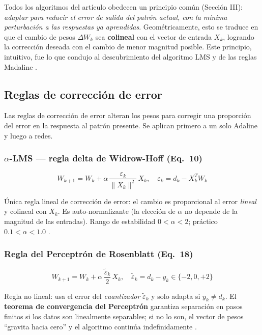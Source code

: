 \documentclass[11pt,a4paper]{article}
\newcommand{\norm}[1]{\lVert#1\rVert}
\begin{document}
Todos los algoritmos del artículo obedecen un principio común (Sección III): \emph{adaptar para
reducir el error de salida del patrón actual, con la mínima perturbación a las respuestas ya
aprendidas}. Geométricamente, esto se traduce en que el cambio de pesos $\Delta W_k$ sea
\textbf{colineal} con el vector de entrada $X_k$, logrando la corrección deseada con el cambio de
menor magnitud posible. Este principio, intuitivo, fue lo que condujo al descubrimiento del
algoritmo LMS y de las reglas Madaline \cite{widrow1990}.

\subsection{Reglas de corrección de error}\label{ssec:ec}

Las reglas de corrección de error alteran los pesos para corregir una proporción del error en la
respuesta al patrón presente. Se aplican primero a un solo Adaline y luego a redes.

\subsubsection{$\alpha$-LMS — regla delta de Widrow-Hoff (Eq.~10)}

\begin{equation}
W_{k+1} = W_k + \alpha\,\frac{\varepsilon_k}{\norm{X_k}^2}\,X_k,\quad \varepsilon_k = d_k - X_k^T W_k
\label{eq:alpha_lms}
\end{equation}

Única regla lineal de corrección de error: el cambio es proporcional al error \emph{lineal} y
colineal con $X_k$. Es auto-normalizante (la elección de $\alpha$ no depende de la magnitud de las
entradas). Rango de estabilidad $0 < \alpha < 2$; práctico $0.1 < \alpha < 1.0$ \cite{widrow1990}.

\subsubsection{Regla del Perceptrón de Rosenblatt (Eq.~18)}

\begin{equation}
W_{k+1} = W_k + \alpha\,\frac{\tilde{\varepsilon}_k}{2}\,X_k,\quad \tilde{\varepsilon}_k = d_k - y_k \in \{-2,0,+2\}
\label{eq:perceptron}
\end{equation}

Regla no lineal: usa el error del \emph{cuantizador} $\tilde{\varepsilon}_k$ y solo adapta si
$y_k \neq d_k$. El \textbf{teorema de convergencia del Perceptrón} garantiza separación en pasos
finitos si los datos son linealmente separables; si no lo son, el vector de pesos ``gravita hacia
cero'' y el algoritmo continúa indefinidamente \cite{widrow1990,rosenblatt1958}.
\end{document}
